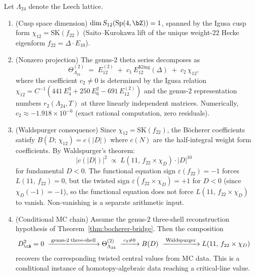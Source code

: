 \begin{theorem}%
\label{thm:leech-chi12-projection}%
%
%
Let $\Lambda_{24}$ denote the Leech lattice.
\begin{enumerate}[label=\textup{(\roman*)}]
\item \textup{(Cusp space dimension)}
$\dim S_{12}(\mathrm{Sp}(4,\bZ)) = 1$, spanned by the
Igusa cusp form
$\chi_{12} = \mathrm{SK}(f_{22})$
\textup{(}Saito--Kurokawa lift of the unique weight-$22$
Hecke eigenform $f_{22} = \Delta \cdot E_{10}$\textup{)}.

\item \textup{(Nonzero projection)}
The genus-$2$ theta series decomposes as
\begin{equation}\label{eq:leech-chi12-decomposition}
\Theta_{\Lambda_{24}}^{(2)}
\;=\;
E_{12}^{(2)}
\;+\;
c_1\,E_{12}^{\mathrm{Kling}}(\Delta)
\;+\;
c_2\,\chi_{12},
\end{equation}
where the coefficient $c_2 \neq 0$ is determined by the Igusa
relation $\chi_{12} = C^{-1}(441\,E_4^3 + 250\,E_6^2 -
691\,E_{12}^{(2)})$ and the genus-$2$ representation numbers
$r_2(\Lambda_{24}, T)$ at three linearly independent matrices.
Numerically, $c_2 \approx -1.918 \times 10^{-6}$
\textup{(}exact rational computation, zero residuals\textup{)}.

\item \textup{(Waldspurger consequence)}
Since $\chi_{12} = \mathrm{SK}(f_{22})$, the B\"ocherer
coefficients satisfy
$B(D;\, \chi_{12}) = c(\lvert D\rvert)$
where $c(N)$ are the half-integral weight form coefficients.
By Waldspurger's theorem:
\begin{equation}\label{eq:waldspurger-leech}
\lvert c(\lvert D\rvert)\rvert^2
\;\propto\;
L(11,\, f_{22} \times \chi_D)
\cdot \lvert D\rvert^{10}
\end{equation}
for fundamental $D < 0$. The functional equation sign
$\varepsilon(f_{22}) = -1$ forces $L(11,\, f_{22}) = 0$,
but the twisted sign
$\varepsilon(f_{22} \times \chi_D) = +1$ for $D < 0$
\textup{(}since $\chi_D(-1) = -1$\textup{)},
so the functional equation does not force
$L(11,\, f_{22} \times \chi_D)$ to vanish. Non-vanishing is a
separate arithmetic input.

\item \textup{(Conditional MC chain)}
Assume the genus-$2$ three-shell reconstruction hypothesis of
Theorem~\textup{\ref{thm:bocherer-bridge}}. Then the composition
\[
D_\cA^2 = 0
\;\xrightarrow{\;\text{genus-}2\;\text{three-shell}\;}
\Theta_{\Lambda_{24}}^{(2)}
\;\xrightarrow{\;c_2 \neq 0\;}
B(D)
\;\xrightarrow{\;\text{Waldspurger}\;}
L(11,\, f_{22} \times \chi_D)
\]
recovers the corresponding twisted central values from MC data.
This is a conditional instance of homotopy-algebraic data reaching a
critical-line value.
\end{enumerate}
\end{theorem}

